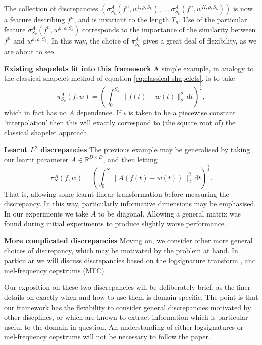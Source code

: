 \documentclass{article}
\theoremstyle{plain}
\theoremstyle{definition}
\newcommand{\reals}{\mathbb{R}}
\newcommand{\norm}[1]{\|#1\|}
\newcommand{\dee}{\,\mathrm{d}}
\newcommand{\boldheading}[1]{

\textbf{#1}\quad}
\begin{document}
	The collection of discrepancies $(\sigma^A_{S_k}(f^n, w^{1, \rho, S_k}), \ldots, \sigma^A_{S_k}(f^n, w^{K, \rho, S_k}))$ is now a feature describing $f^n$, and is invariant to the length $T_n$. Use of the particular feature $\sigma^A_{S_k}(f^n, w^{k, \rho, S_k})$ corresponds to the importance of the similarity between $f^n$ and $w^{k, \rho, S_k}$. In this way, the choice of $\pi^A_{S_k}$ gives a great deal of flexibility, as we are about to see.
	
	\boldheading{Existing shapelets fit into this framework}
	A simple example, in analogy to the classical shapelet method of equation \eqref{eq:classical-shapelets}, is to take
	\begin{equation*}
	\pi^A_{S_k}(f, w) = (\int_{0}^{S_k} \norm{f(t) - w(t)}_2^2 \dee t)^{\frac{1}{2}},
	\end{equation*}
	which in fact has no $A$ dependence. If $\iota$ is taken to be a piecewise constant `interpolation' then this will exactly correspond to (the square root of) the classical shapelet approach.
	
	\boldheading{Learnt $L^2$ discrepancies}
	The previous example may be generalised by taking our learnt parameter $A \in \reals^{D \times D}$, and then letting
	\begin{equation}\label{eq:learnt-discrepancy}
	\pi^A_{S}(f, w) = (\int_{0}^{S} \norm{A(f(t) - w(t))}_2^2 \dee t)^{\frac{1}{2}}.
	\end{equation}
	That is, allowing some learnt linear transformation before measuring the discrepancy. In this way, particularly informative dimensions may be emphasised. In our experiments we take $A$ to be diagonal. Allowing a general matrix was found during initial experiments to produce slightly worse performance.
	
	\boldheading{More complicated discrepancies}
	Moving on, we consider other more general choices of discrepancy, which may be motivated by the problem at hand. In particular we will discuss discrepancies based on the logsignature transform \cite{logsig-rnn}, and mel-frequency cepstrums (MFC) \cite{mfc}.
	
	Our exposition on these two discrepancies will be deliberately brief, as the finer details on exactly when and how to use them is domain-specific. The point is that our framework has the flexibility to consider general discrepancies motivated by other discplines, or which are known to extract information which is particular useful to the domain in question. An understanding of either logsignatures or mel-frequency cepstrums will not be necessary to follow the paper.
	
\end{document}
